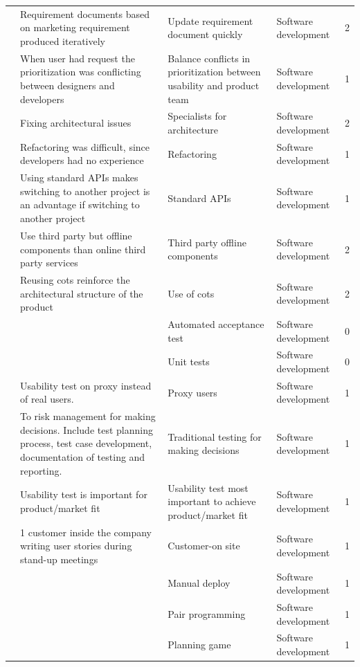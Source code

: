 \documentclass[final,5p,times,twocolumn]{elsarticle}
\begin{document}
\begin{center}
\begin{longtable}{|p{0.4in}|p{3in}|p{1.3in}|p{1in}|p{0.3in}|}
\cite{Ambler2002} & Requirement documents based on marketing requirement produced iteratively & Update requirement document quickly & Software development & 2 \\
\cite{Mirel2000} & When user had request the prioritization was conflicting between designers and developers & Balance conflicts in prioritization between usability and product team & Software development & 1 \\
\cite{Ambler2002} & Fixing architectural issues & Specialists for architecture & Software development & 2 \\
\cite{Deias} & Refactoring was difficult, since developers had no experience & Refactoring & Software development & 1 \\
\cite{Wall2001} & Using standard APIs makes switching to another project is an advantage if switching to another project & Standard APIs & Software development & 1 \\
\cite{Jansen2008} & Use third party but offline components than online third party services & Third party offline components & Software development & 2 \\
\cite{Jansen2008} & Reusing cots reinforce the architectural structure of the product & Use of cots & Software development & 2 \\
\cite{Taipale2010} &       & Automated acceptance test & Software development & 0 \\
\cite{Taipale2010} &       & Unit tests & Software development & 0 \\
\cite{Mirel2000} & Usability test on proxy instead of real users. & Proxy users & Software development & 1 \\
\cite{Mater2000} & To risk management for making decisions. Include test planning process, test case development, documentation of testing and reporting. & Traditional testing for making decisions & Software development & 1 \\
\cite{Mirel2000} & Usability test is important for product/market fit & Usability test most important to achieve product/market fit & Software development & 1 \\
\cite{Silva2005} & 1 customer inside the company writing user stories during stand-up meetings & Customer-on site & Software development & 1 \\
\cite{Silva2005} &       & Manual deploy & Software development & 1 \\
\cite{Silva2005} &       & Pair programming & Software development & 1 \\
\cite{Silva2005} &       & Planning game & Software development & 1 \\

\end{longtable}
\end{center}
\end{document}
